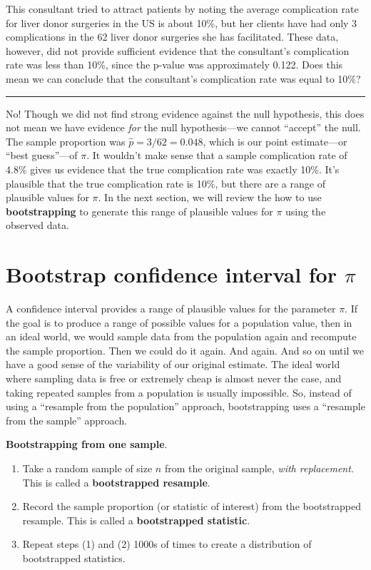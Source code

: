 \documentclass[
  10pt,
  openany]{book}
\providecommand{\tightlist}{%
  \setlength{\itemsep}{0pt}\setlength{\parskip}{0pt}}
\theoremstyle{definition}
\theoremstyle{definition}
\theoremstyle{definition}
\theoremstyle{definition}
\theoremstyle{remark}
\begin{document}
This consultant tried to attract patients by noting the average complication rate for liver donor surgeries in the US is about 10\%, but her clients have had only 3 complications in the 62 liver donor surgeries she has facilitated. These data, however, did not provide sufficient evidence that the consultant's complication rate was less than 10\%, since the p-value was approximately 0.122. Does this mean we can conclude that the consultant's complication rate was equal to 10\%?

\begin{center}\rule{0.5\linewidth}{0.5pt}\end{center}

No! Though we did not find strong evidence against the null hypothesis, this does not mean we have evidence \emph{for} the null hypothesis---we cannot ``accept'' the null. The sample proportion was \(\hat{p} = 3/62 = 0.048\), which is our point estimate---or ``best guess''---of \(\pi\). It wouldn't make sense that a sample complication rate of 4.8\% gives us evidence that the true complication rate was exactly 10\%. It's plausible that the true complication rate is 10\%, but there are a range of plausible values for \(\pi\). In the next section, we will review the how to use \textbf{bootstrapping} to generate this range of plausible values for \(\pi\) using the observed data.

\section{\texorpdfstring{Bootstrap confidence interval for \(\pi\)}{Bootstrap confidence interval for \textbackslash pi}}\label{boot-ci-prop}

A confidence interval provides a range of plausible values for the parameter \(\pi\). If the goal is to produce a range of possible values for a population value, then in an ideal world, we would sample data from the population again and recompute the sample proportion. Then we could do it again. And again. And so on until we have a good sense of the variability of our original estimate. The ideal world where sampling data is free or extremely cheap is almost never the case, and taking repeated samples from a population is usually impossible. So, instead of using a ``resample from the population'' approach, bootstrapping uses a ``resample from the sample'' approach.

\textbf{Bootstrapping from one sample}.

\begin{enumerate}
\def\labelenumi{\arabic{enumi}.}
\tightlist
\item
  Take a random sample of size \(n\) from the original sample, \emph{with replacement}. This is called a \textbf{bootstrapped resample}.
\item
  Record the sample proportion (or statistic of interest) from the bootstrapped resample. This is called a \textbf{bootstrapped statistic}.
\item
  Repeat steps (1) and (2) 1000s of times to create a distribution of bootstrapped statistics.
\end{enumerate}
\end{document}
